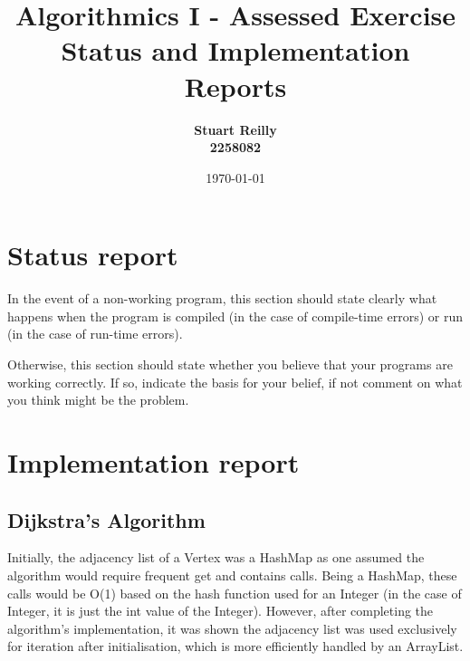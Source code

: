 \documentclass{article}
\title{Algorithmics I - Assessed Exercise\\ \vspace{4mm}
Status and Implementation Reports}
\author{\textbf{Stuart Reilly} \\ \textbf{2258082} }
\date{\today}
\begin{document}
    \maketitle

    \section*{Status report}

    In the event of a non-working program, this section should state clearly what happens when the program is compiled (in the case of compile-time errors) or run (in the case of run-time errors).

    Otherwise, this section should state whether you believe that your programs are working correctly. If so, indicate the basis for your belief, if not comment on what you think might be the problem.

    \section*{Implementation report}

    \subsection*{Dijkstra's Algorithm}

    Initially, the adjacency list of a Vertex was a HashMap as one assumed the algorithm would require
    frequent get and contains calls.
    Being a HashMap, these calls would be O(1) based on the hash function used for an Integer (in the case of Integer,
    it is just the int value of the Integer).
    However, after completing the algorithm's implementation, it was shown the adjacency list was used exclusively for
    iteration after initialisation, which is more efficiently handled by an ArrayList.
\end{document}
